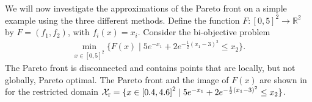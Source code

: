 \documentclass[main.tex]{subfiles}
\begin{document}
\begin{example}\label{ex:pareto_disconnected}
  We will now investigate the approximations of the Pareto
  front on a simple example using the three different methods.
  Define the function
  $F:{[0,5]}^2\to\mathbb{R}^2$ by $F=(f_1,f_2)$, with $f_i(x)=x_i$.
  Consider the bi-objective problem
  \begin{align}
    \min_{x\in{[0,5]}^2}\{F(x)\mid
    5e^{-x_1}+2e^{-\frac{1}{2}{(x_1-3)}^2} \leq x_2\}.
  \end{align}
  The Pareto front is disconnected and contains points that are
  locally, but not globally, Pareto optimal. The Pareto front and the
  image of $F(x)$ are shown in  for
  the restricted domain $\mathcal{X}_{\textnormal{r}}=\{x\in {[0.4,4.6]}^2 \mid
  5e^{-x_1}+2e^{-\frac{1}{2}{(x_1-3)}^2} \leq x_2\}$.


\end{example}
\end{document}
